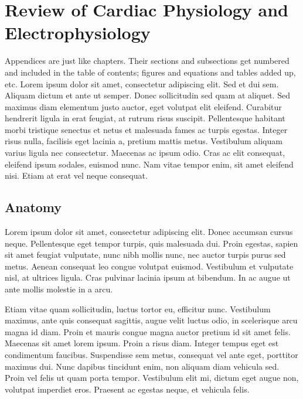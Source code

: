 \chapter{\label{app:1-cardiophys}Review of Cardiac Physiology and Electrophysiology}

\minitoc

Appendices are just like chapters.  Their sections and subsections get numbered and included in the table of contents; figures and equations and tables added up, etc.  Lorem ipsum dolor sit amet, consectetur adipiscing elit. Sed et dui sem. Aliquam dictum et ante ut semper. Donec sollicitudin sed quam at aliquet. Sed maximus diam elementum justo auctor, eget volutpat elit eleifend. Curabitur hendrerit ligula in erat feugiat, at rutrum risus suscipit. Pellentesque habitant morbi tristique senectus et netus et malesuada fames ac turpis egestas. Integer risus nulla, facilisis eget lacinia a, pretium mattis metus. Vestibulum aliquam varius ligula nec consectetur. Maecenas ac ipsum odio. Cras ac elit consequat, eleifend ipsum sodales, euismod nunc. Nam vitae tempor enim, sit amet eleifend nisi. Etiam at erat vel neque consequat.

\section{Anatomy}
\label{sec:anatomy}

Lorem ipsum dolor sit amet, consectetur adipiscing elit. Donec accumsan cursus neque. Pellentesque eget tempor turpis, quis malesuada dui. Proin egestas, sapien sit amet feugiat vulputate, nunc nibh mollis nunc, nec auctor turpis purus sed metus. Aenean consequat leo congue volutpat euismod. Vestibulum et vulputate nisl, at ultrices ligula. Cras pulvinar lacinia ipsum at bibendum. In ac augue ut ante mollis molestie in a arcu.

Etiam vitae quam sollicitudin, luctus tortor eu, efficitur nunc. Vestibulum maximus, ante quis consequat sagittis, augue velit luctus odio, in scelerisque arcu magna id diam. Proin et mauris congue magna auctor pretium id sit amet felis. Maecenas sit amet lorem ipsum. Proin a risus diam. Integer tempus eget est condimentum faucibus. Suspendisse sem metus, consequat vel ante eget, porttitor maximus dui. Nunc dapibus tincidunt enim, non aliquam diam vehicula sed. Proin vel felis ut quam porta tempor. Vestibulum elit mi, dictum eget augue non, volutpat imperdiet eros. Praesent ac egestas neque, et vehicula felis.

